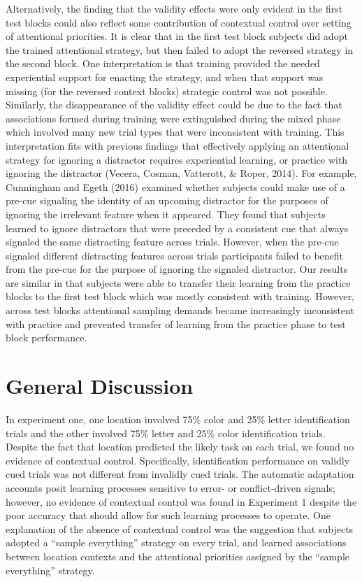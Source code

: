 \documentclass[english,,man,floatsintext]{apa6}
\begin{document}
Alternatively, the finding that the validity effects were only evident
in the first test blocks could also reflect some contribution of
contextual control over setting of attentional priorities. It is clear
that in the first test block subjects did adopt the trained attentional
strategy, but then failed to adopt the reversed strategy in the second
block. One interpretation is that training provided the needed
experiential support for enacting the strategy, and when that support
was missing (for the reversed context blocks) strategic control was not
possible. Similarly, the disappearance of the validity effect could be
due to the fact that associations formed during training were
extinguished during the mixed phase which involved many new trial types
that were inconsistent with training. This interpretation fits with
previous findings that effectively applying an attentional strategy for
ignoring a distractor requires experiential learning, or practice with
ignoring the distractor (Vecera, Cosman, Vatterott, \& Roper, 2014). For
example, Cunningham and Egeth (2016) examined whether subjects could
make use of a pre-cue signaling the identity of an upcoming distractor
for the purposes of ignoring the irrelevant feature when it appeared.
They found that subjects learned to ignore distractors that were
preceded by a consistent cue that always signaled the same distracting
feature across trials. However, when the pre-cue signaled different
distracting features across trials participants failed to benefit from
the pre-cue for the purpose of ignoring the signaled distractor. Our
results are similar in that subjects were able to transfer their
learning from the practice blocks to the first test block which was
mostly consistent with training. However, across test blocks attentional
sampling demands became increasingly inconsistent with practice and
prevented transfer of learning from the practice phase to test block
performance.

\section{General Discussion}\label{general-discussion}

In experiment one, one location involved 75\% color and 25\% letter
identification trials and the other involved 75\% letter and 25\% color
identification trials. Despite the fact that location predicted the
likely task on each trial, we found no evidence of contextual control.
Specifically, identification performance on validly cued trials was not
different from invalidly cued trials. The automatic adaptation accounts
posit learning processes sensitive to error- or conflict-driven signals;
however, no evidence of contextual control was found in Experiment 1
despite the poor accuracy that should allow for such learning processes
to operate. One explanation of the absence of contextual control was the
suggestion that subjects adopted a \enquote{sample everything} strategy
on every trial, and learned associations between location contexts and
the attentional priorities assigned by the \enquote{sample everything}
strategy.
\end{document}
